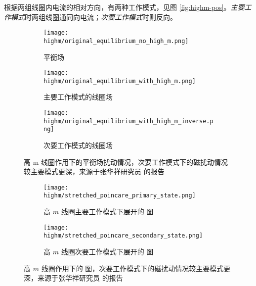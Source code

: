 根据两组线圈内电流的相对方向，有两种工作模式，见图 \ref{fig:highm-pos}。\textit{主要工作模式}时两组线圈通同向电流；\textit{次要工作模式}时则反向。



\begin{figure}[htbp]
    \centering%
    \begin{subfigure}{0.33\textwidth}
      \texttt{[image: highm/original\_equilibrium\_no\_high\_m.png]}
      \caption{平衡场}
    \end{subfigure}%
    \begin{subfigure}{0.33\textwidth}
      \texttt{[image: highm/original\_equilibrium\_with\_high\_m.png]}
      \caption{主要工作模式的线圈场}
    \end{subfigure}
    \begin{subfigure}{0.33\textwidth}
      \texttt{[image: highm/original\_equilibrium\_with\_high\_m\_inverse.png]}
      \caption{次要工作模式的线圈场}
    \end{subfigure}
    \caption{高 m 线圈作用下的平衡场扰动情况，次要工作模式下的磁扰动情况较主要模式更深，来源于张华祥研究员 \cite{zhang_highm} 的报告}
    \label{fig:highm-three-subfig-poincare}
  \end{figure}

  
\begin{figure}[htbp]
    \centering%
    \begin{subfigure}{0.8\textwidth}
        \texttt{[image: highm/stretched\_poincare\_primary\_state.png]}
        \caption{高 $m$ 线圈主要工作模式下展开的 \Poincare 图}
    \end{subfigure}
    \begin{subfigure}{0.8\textwidth}
        \texttt{[image: highm/stretched\_poincare\_secondary\_state.png]}
        \caption{高 $m$ 线圈次要工作模式下展开的 \Poincare 图}
    \end{subfigure}
    \caption{高 $m$ 线圈作用下的 \Poincare 图，次要工作模式下的磁扰动情况较主要模式更深，来源于张华祥研究员 \cite{zhang_highm} 的报告}
    \label{fig:highm-stretched-poincare}
\end{figure}
  








